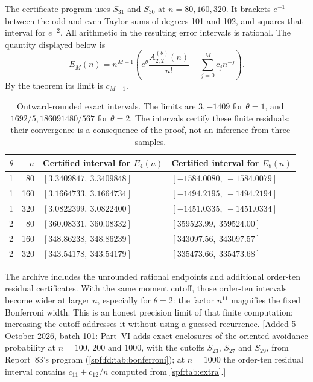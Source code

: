 \documentclass[11pt]{article}
\numberwithin{equation}{section}
\theoremstyle{definition}
\theoremstyle{remark}
\theoremstyle{definition}
\begin{document}
The certificate program uses $S_{31}$ and $S_{30}$ at $n=80,160,320$.
It brackets $e^{-1}$ between the odd and even Taylor sums of degrees 101 and
102, and squares that interval for $e^{-2}$. All arithmetic in the resulting
error intervals is rational. The quantity displayed below is
\begin{equation}
 E_M(n)=n^{M+1}\left(e^{\theta}\frac{A^{(\theta)}_{2,2}(n)}{n!}
                       -\sum_{j=0}^{M}c_jn^{-j}\right).
 \label{spf:eq:scaled-error}
\end{equation}
By the theorem its limit is $c_{M+1}$.

\begin{table}[htbp]
\centering\small
\renewcommand{\arraystretch}{1.17}
\begin{tabular}{rrll}
\toprule
$\theta$ & $n$ & Certified interval for $E_4(n)$ & Certified interval for $E_8(n)$\\
\midrule
1&80  &$[3.3409847,\ 3.3409848]$ &$[-1584.0080,\ -1584.0079]$\\
1&160 &$[3.1664733,\ 3.1664734]$ &$[-1494.2195,\ -1494.2194]$\\
1&320 &$[3.0822399,\ 3.0822400]$ &$[-1451.0335,\ -1451.0334]$\\
2&80  &$[360.08331,\ 360.08332]$ &$[359523.99,\ 359524.00]$\\
2&160 &$[348.86238,\ 348.86239]$ &$[343097.56,\ 343097.57]$\\
2&320 &$[343.54178,\ 343.54179]$ &$[335473.66,\ 335473.68]$\\
\bottomrule
\end{tabular}
\caption{Outward-rounded exact intervals. The limits are $3,-1409$ for
$\theta=1$, and $1692/5,186091480/567$ for $\theta=2$. The intervals certify
these finite residuals; their convergence is a consequence of the proof, not
an inference from three samples.}
\label{spf:tab:certificates}
\end{table}

The archive includes the unrounded rational endpoints and additional
order-ten residual certificates. With the same moment cutoff, those
order-ten intervals become wider at larger $n$, especially for $\theta=2$:
the factor $n^{11}$ magnifies the fixed Bonferroni width. This is an honest
precision limit of that finite computation; increasing the cutoff addresses
it without using a guessed recurrence.
[Added 5 October 2026, batch 101: Part~VI adds exact enclosures of the
oriented avoidance probability at $n=100$, $200$ and $1000$, with the
cutoffs $S_{23}$, $S_{27}$ and $S_{29}$, from Report~83's program
(\cref{spf:fd:tab:bonferroni}); at $n=1000$ the order-ten residual interval
contains $c_{11}+c_{12}/n$ computed from \cref{spf:tab:extra}.]
\end{document}
